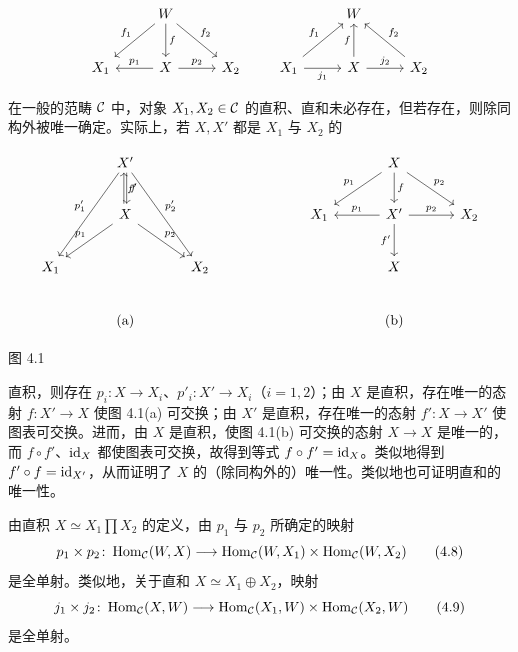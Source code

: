\[
\begin{tikzcd}[row sep=2.4em, column sep=2.6em]
  & W \arrow[dl,"f_1"'] \arrow[d,"f"] \arrow[dr,"f_2"] & \\
  X_1 & X \arrow[l,"p_1"'] \arrow[r,"p_2"] & X_2
\end{tikzcd}
\qquad
\begin{tikzcd}[row sep=2.4em, column sep=2.6em]
  & W & \\
  X_1 \arrow[ur,"f_1"] \arrow[r,"j_1"'] & X \arrow[u,"f"] \arrow[r,"j_2"] & X_2 \arrow[ul,"f_2"']
\end{tikzcd}
\]

在一般的范畴 $\mathcal{C}$ 中，对象 $X_1,X_2\in\mathcal{C}$ 的直积、直和未必存在，但若存在，则除同构外被唯一确定。实际上，若 $X,X'$ 都是 $X_1$ 与 $X_2$ 的

\[\begin{tikzcd}[row sep=2.2em, column sep=3.2em]
  & X' \arrow[ddl,"p_1'"'] \arrow[ddr,"p_2'"] \arrow[d,shift left=1pt,"f"] & & & & X \arrow[dl,"p_1"'] \arrow[dr,"p_2"] \arrow[d,"f"] & \\
  & X \arrow[dl,"p_1"'] \arrow[dr,"p_2"] \arrow[u,shift left=1pt,"f'"'] & & & X_1 & X' \arrow[l,"p_1"'] \arrow[r,"p_2"] \arrow[d,"f'"'] & X_2 \\
  X_1 & & X_2 & & & X & \\
  & \text{(a)} & & & & \text{(b)} &
\end{tikzcd}\]
\begin{center}\small 图 4.1\end{center}

直积，则存在 $p_i\colon X\to X_i$、$p'_i\colon X'\to X_i$（$i=1,2$）；由 $X$ 是直积，存在唯一的态射 $f\colon X'\to X$ 使图 4.1(a) 可交换；由 $X'$ 是直积，存在唯一的态射 $f'\colon X\to X'$ 使图表可交换。进而，由 $X$ 是直积，使图 4.1(b) 可交换的态射 $X\to X$ 是唯一的，而 $f\circ f'$、$\mathrm{id}_X$ 都使图表可交换，故得到等式 $f\circ f'=\mathrm{id}_X$。类似地得到 $f'\circ f=\mathrm{id}_{X'}$，从而证明了 $X$ 的（除同构外的）唯一性。类似地也可证明直和的唯一性。

由直积 $X\simeq X_1\prod X_2$ 的定义，由 $p_1$ 与 $p_2$ 所确定的映射
\begin{equation}
  p_1\times p_2\colon\operatorname{Hom}_{\mathcal{C}}(W,X)\longrightarrow\operatorname{Hom}_{\mathcal{C}}(W,X_1)\times\operatorname{Hom}_{\mathcal{C}}(W,X_2) \tag{4.8}
\end{equation}
是全单射。类似地，关于直和 $X\simeq X_1\oplus X_2$，映射
\begin{equation}
  j_1\times j_2\colon\operatorname{Hom}_{\mathcal{C}}(X,W)\longrightarrow\operatorname{Hom}_{\mathcal{C}}(X_1,W)\times\operatorname{Hom}_{\mathcal{C}}(X_2,W) \tag{4.9}
\end{equation}
是全单射。

